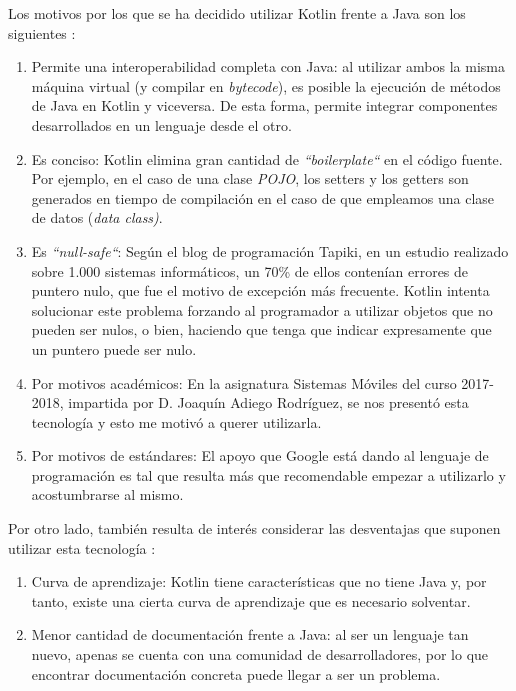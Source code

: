 \documentclass[twoside]{report}
\begin{document}
Los motivos por los que se ha decidido utilizar Kotlin frente a Java son los siguientes \cite{kotlin}:
\begin{enumerate}

\item Permite una interoperabilidad completa con Java: al utilizar ambos la misma máquina virtual (y compilar en \textit{bytecode}), es posible la ejecución de métodos de Java en Kotlin y viceversa. De esta forma, permite integrar componentes desarrollados en un lenguaje desde el otro.

\item Es conciso: Kotlin elimina gran cantidad de \textit{“boilerplate“} en el código fuente. Por ejemplo, en el caso de una clase \textit{POJO}, los setters y los getters son generados en tiempo de compilación en el caso de que empleamos una clase de datos (\textit{data class)}.

\item Es \textit{“null-safe“}: Según el blog de programación \cite{tapikinull} Tapiki, en un estudio realizado sobre 1.000 sistemas informáticos, un 70\% de ellos contenían errores de puntero nulo, que fue el motivo de excepción más frecuente. Kotlin intenta solucionar este problema forzando al programador a utilizar objetos que no pueden ser nulos, o bien, haciendo que tenga que indicar expresamente que un puntero puede ser nulo.

\item Por motivos académicos: En la asignatura \cite{smovkotlin} Sistemas Móviles del curso 2017-2018, impartida por D. Joaquín Adiego Rodríguez, se nos presentó esta tecnología y esto me motivó a querer utilizarla.

\item Por motivos de estándares: El apoyo que Google está dando al lenguaje de programación es tal que resulta más que recomendable empezar a utilizarlo y acostumbrarse al mismo.
\end{enumerate}

Por otro lado, también resulta de interés considerar las desventajas que suponen utilizar esta tecnología \cite{disadvKotlin}:
\begin{enumerate}

\item Curva de aprendizaje: Kotlin tiene características que no tiene Java y, por tanto, existe una cierta curva de aprendizaje que es necesario solventar.

\item Menor cantidad de documentación frente a Java: al ser un lenguaje tan nuevo, apenas se cuenta con una comunidad de desarrolladores, por lo que encontrar documentación concreta puede llegar a ser un problema.
\end{enumerate}
\end{document}
